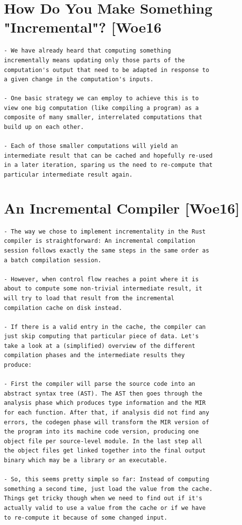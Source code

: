 \documentclass[12pt, a4paper]{report}
\begin{document}
\section*{How Do You Make Something "Incremental"? [Woe16}

\begin{verbatim}
- We have already heard that computing something
incrementally means updating only those parts of the
computation's output that need to be adapted in response to
a given change in the computation's inputs.

- One basic strategy we can employ to achieve this is to
view one big computation (like compiling a program) as a
composite of many smaller, interrelated computations that
build up on each other.

- Each of those smaller computations will yield an
intermediate result that can be cached and hopefully re-used
in a later iteration, sparing us the need to re-compute that
particular intermediate result again.
\end{verbatim}
\cite{rust_blog_incremental_compilation}

\section*{An Incremental Compiler [Woe16]}

\begin{verbatim}
- The way we chose to implement incrementality in the Rust
compiler is straightforward: An incremental compilation
session follows exactly the same steps in the same order as
a batch compilation session.

- However, when control flow reaches a point where it is
about to compute some non-trivial intermediate result, it
will try to load that result from the incremental
compilation cache on disk instead.

- If there is a valid entry in the cache, the compiler can
just skip computing that particular piece of data. Let's
take a look at a (simplified) overview of the different
compilation phases and the intermediate results they
produce:

- First the compiler will parse the source code into an
abstract syntax tree (AST). The AST then goes through the
analysis phase which produces type information and the MIR
for each function. After that, if analysis did not find any
errors, the codegen phase will transform the MIR version of
the program into its machine code version, producing one
object file per source-level module. In the last step all
the object files get linked together into the final output
binary which may be a library or an executable.

- So, this seems pretty simple so far: Instead of computing
something a second time, just load the value from the cache.
Things get tricky though when we need to find out if it's
actually valid to use a value from the cache or if we have
to re-compute it because of some changed input.
\end{verbatim}
\cite{rust_blog_incremental_compilation}
\end{document}
